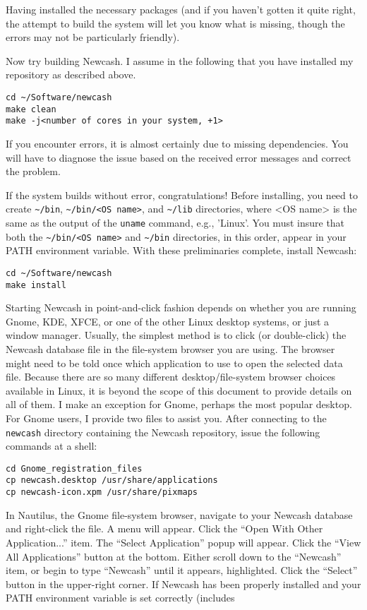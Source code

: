 \documentclass{report}
\begin{document}
Having installed the necessary packages (and if you haven't gotten it quite right, the attempt to build the system will let you know what is missing, though the errors may not be particularly friendly). 

Now try building Newcash. I assume in the following that you have installed my repository as described above.
\begin{verbatim}
cd ~/Software/newcash
make clean
make -j<number of cores in your system, +1>
\end{verbatim}

If you encounter errors, it is almost certainly due to missing dependencies. You will have to diagnose the issue based on the received error messages and correct the problem.

If the system builds without error, congratulations! Before installing, you need to create \verb|~/bin|, \verb|~/bin/<OS name>|, and \verb|~/lib| directories, where <OS name> is the same as the output of the
\verb|uname| command, e.g., 'Linux'. You must insure that both the \verb|~/bin/<OS name>| and \verb|~/bin| directories, in this order, appear in your PATH environment variable. With these preliminaries complete, install Newcash:
\begin{verbatim}
cd ~/Software/newcash
make install
\end{verbatim}

Starting Newcash in point-and-click fashion depends on whether you are running Gnome, KDE, XFCE, or one of the other Linux desktop systems, or just a window manager.  
Usually, the simplest method is to click (or double-click) the Newcash database file in the file-system browser you are using. The browser might need to be told once which application to use to open the selected data file. 
Because there are so many different desktop/file-system browser choices available in Linux, it is beyond the scope of this document to provide details on all of them.  
I make an exception for Gnome, perhaps the most popular desktop. For Gnome users,  I provide two files to assist you. After connecting to the \verb|newcash| directory containing the Newcash repository, 
issue the following commands at a shell:
\begin{verbatim}
cd Gnome_registration_files
cp newcash.desktop /usr/share/applications
cp newcash-icon.xpm /usr/share/pixmaps
\end{verbatim}

In Nautilus, the Gnome file-system browser, navigate to your Newcash database and right-click the file. A menu will appear. Click the ``Open With Other Application...'' item. The ``Select Application'' popup will appear. Click the ``View All Applications'' button at the bottom. Either scroll down to the ``Newcash'' item, or begin to type ``Newcash'' until it appears, highlighted. Click the ``Select'' button in the upper-right corner. If Newcash has been properly installed and your PATH environment variable is set correctly (includes
\end{document}
